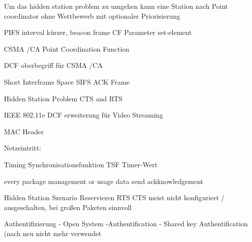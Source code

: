 Um das hidden station problem zu umgehen kann eine Station nach \textcite{sauter_wireless_2022}
Point coordinator
ohne Wettbewerb mit optionaler Priorisierung

PIFS interval kürzer,
beacon frame
CF Parameter set-element

CSMA /CA
Point Coordination Function

\textcite{sauter_wireless_2022}
DCF oberbegriff für CSMA /CA


Short Interframe Space SIFS ACK Frame

Hidden Station Problem
CTS and RTS

IEEE 802.11e DCF erweiterung für Video Streaming



MAC Header

Netzeintritt:

Timing Synchronisationsfunktion TSF Timer-Wert

\textcite{sauter_wireless_2022}
every package management or usage data send ackknowledgement

Hidden Station Szenario
Reservieren
RTS CTS
meist nicht konfiguriert / ausgeschalten, bei großen Paketen sinnvoll



Authentifizierung
- Open System -Authentification
- Shared key Authentification
(nach neu nicht mehr verwendet